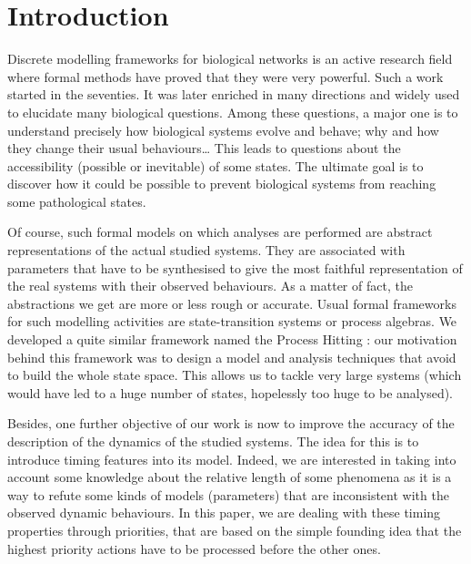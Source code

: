 \section{Introduction}
\label{sec:intro}

Discrete modelling frameworks for biological networks is an active research field where formal methods have proved that they were very powerful.
Such a work started in the seventies.
It was later enriched in many directions and widely used to elucidate many biological questions.
Among these questions, a major one is to understand precisely how biological systems evolve and behave; why and how they change their usual behaviours…
This leads to questions about the accessibility (possible or inevitable) of some states.
The ultimate goal is to discover how it could be possible to prevent biological systems from reaching some pathological states.

Of course, such formal models on which analyses are performed are abstract representations of the actual studied systems.
They are associated with parameters that have to be synthesised %
to give the most faithful representation of the real systems with their observed behaviours.
As a matter of fact, the abstractions we get are more or less rough or accurate.
Usual formal frameworks for such modelling activities are state-transition systems or process algebras. %
We developed a quite similar framework named the Process Hitting \cite{PMR10-TCSB}: %
our motivation behind this framework was to design a model and analysis techniques that avoid to build the whole state space.
This allows us to tackle very large systems
(which would have led to a huge number of states, hopelessly too huge to be analysed).

Besides, one further objective of our work is now %
to improve the accuracy of the description of the dynamics of the studied systems.
The idea for this is to introduce timing features into its model.
Indeed, we are interested in taking into account some knowledge about the relative length of some phenomena as it is a way to refute some kinds of models (parameters) that are inconsistent with the observed dynamic behaviours.
In this paper, we are dealing with these timing properties through priorities,
that are based on the simple founding idea that the highest priority actions have to be processed before the other ones.

